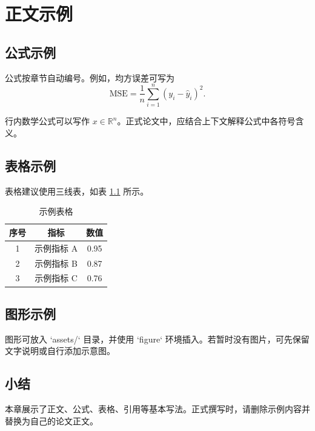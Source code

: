 \chapter{正文示例}

\section{公式示例}

公式按章节自动编号。例如，均方误差可写为
\begin{equation}
  \mathrm{MSE}=\frac{1}{n}\sum_{i=1}^{n}(y_i-\hat{y}_i)^2 .
\end{equation}

行内数学公式可以写作 $x\in\mathbb{R}^{n}$。正式论文中，应结合上下文解释公式中各符号含义。

\section{表格示例}

表格建议使用三线表，如表 \ref{tab:example} 所示。

\begin{table}[H]
  \centering
  \caption{示例表格}
  \label{tab:example}
  \begin{tabular}{ccc}
    \toprule
    序号 & 指标 & 数值 \\
    \midrule
    1 & 示例指标 A & 0.95 \\
    2 & 示例指标 B & 0.87 \\
    3 & 示例指标 C & 0.76 \\
    \bottomrule
  \end{tabular}
\end{table}

\section{图形示例}

图形可放入 `assets/` 目录，并使用 `figure` 环境插入。若暂时没有图片，可先保留文字说明或自行添加示意图。

\section{小结}

本章展示了正文、公式、表格、引用等基本写法。正式撰写时，请删除示例内容并替换为自己的论文正文。
